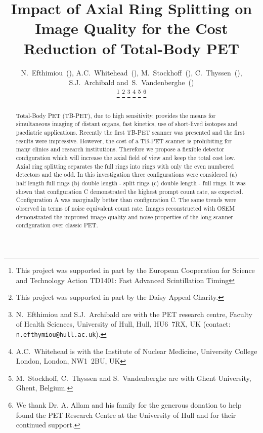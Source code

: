 \documentclass[journal]{IEEEtran}
\begin{document}
\title{Impact of Axial Ring Splitting on Image Quality for the Cost Reduction of Total-Body PET}
\author{N.~Efthimiou~(),
        A.C.~Whitehead~(),
        M.~Stockhoff~(), 
        C.~Thyssen~(),
        S.J.~Archibald
        and~S.~Vandenberghe~()%
        
        \thanks{This project was supported in part by the European Cooperation for Science and Technology Action TD1401: Fast Advanced Scintillation Timing}%
        \thanks{This project was supported in part by the Daisy Appeal Charity.}%
        \thanks{N.~Efthimiou and S.J.~Archibald are with the PET research centre, Faculty of Health Sciences, University of Hull, Hull, HU6~7RX, UK (contact: \texttt{n.efthymiou@hull.ac.uk}).}%
        \thanks{A.C.~Whitehead is with the Institute of Nuclear Medicine, University College London, London, NW1~2BU, UK}%
        \thanks{M.~Stockhoff, C.~Thyssen  and S.~Vandenberghe are with Ghent University, Ghent, Belgium.}%
        \thanks{We thank Dr. A. Allam and his family for the generous donation to help found the PET Research Centre at the University of Hull and for their continued support.}}%

\maketitle
\vspace{-1cm}
    
\IEEEpeerreviewmaketitle
\begin{abstract}
Total-Body PET (TB-PET), due to high sensitivity, provides the means for simultaneous imaging of distant organs, fast kinetics, use of short-lived isotopes and paediatric applications. Recently the first TB-PET scanner was presented and the first results were impressive. However, the cost of a TB-PET scanner is prohibiting for many clinics and research institutions. Therefore we propose a flexible detector configuration which will increase the axial field of view and keep the total cost low. Axial ring splitting separates the full rings into rings with only the even numbered detectors and the odd. In this investigation three configurations were considered (a) half length full rings (b) double length - split rings (c) double length - full rings. It was shown that configuration C demonstrated the highest prompt count rate, as expected. Configuration A was marginally better than configuration C. The same trends were observed in terms of noise equivalent count rate. Images reconstructed with OSEM demonstrated the improved image quality and noise properties of the long scanner configuration over classic PET. 
\end{abstract}
    
\end{document}
